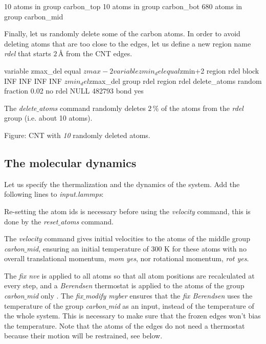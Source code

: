 \begin{lcverbatim}
10 atoms in group carbon_top
10 atoms in group carbon_bot
680 atoms in group carbon_mid
\end{lcverbatim}

\noindent Finally, let us randomly delete some of the carbon atoms.
In order to avoid deleting atoms that are too close to the edges,
let us define a new region name \textit{rdel} that
starts $2\,Å$
from the CNT edges.

\begin{lcverbatim}
variable zmax_del equal ${zmax}-2
variable zmin_del equal ${zmin}+2
region rdel block INF INF INF INF ${zmin_del} ${zmax_del}
group rdel region rdel
delete_atoms random fraction 0.02 no rdel NULL 482793 bond yes
\end{lcverbatim}

\noindent The \textit{delete$\_$atoms} command randomly
deletes $2\,\%$ of the atoms
from the \textit{rdel} group (i.e. about 10 atoms).

\vspace{0.25cm} Figure: CNT with \textit{10} randomly deleted atoms. 

\subsection{The molecular dynamics}
\noindent Let us specify the thermalization and the dynamics of the
system. Add the following lines to \textit{input.lammps}:


\noindent Re-setting the atom ids is necessary before using the \textit{velocity} command,
this is done by the \textit{reset$\_$atoms} command.

\vspace{0.25cm} \noindent The \textit{velocity} command gives initial velocities to
the atoms of the middle group \textit{carbon$\_$mid}, ensuring an initial temperature
of 300 K for these atoms with no overall translational momentum, \textit{mom yes},
nor rotational momentum, \textit{rot yes}.

\vspace{0.25cm} \noindent The \textit{fix nve} is applied to all atoms so that all
atom positions are recalculated at every step, and
a \textit{Berendsen} thermostat is applied to the atoms
of the group \textit{carbon$\_$mid} only \cite{berendsen1984molecular}.
The \textit{fix$\_$modify myber} ensures that the
\textit{fix Berendsen} uses the temperature of the group \textit{carbon$\_$mid} as an
input, instead of the temperature of the whole system. This is necessary
to make sure that the frozen edges won't bias the temperature. Note that the atoms
of the edges do not need a thermostat because their motion will
be restrained, see below.

